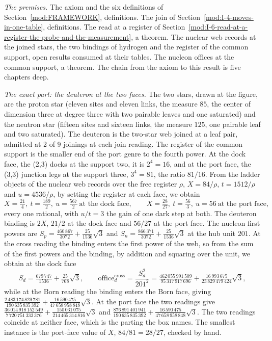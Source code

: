 \begin{chproof}
\textit{The premises.} The axiom and the six definitions of Section~\ref{mod:FRAMEWORK}, definitions. The join of Section~\ref{mod:I-4-moves-in-one-table}, definitions. The read at a register of Section~\ref{mod:I-6-read-at-a-register-the-probe-and-the-measurement}, a theorem. The nuclear web records at the joined stars, the two bindings of hydrogen and the register of the common support, open results consumed at their tables. The nucleon offices at the common support, a theorem. The chain from the axiom to this result is five chapters deep.

\textit{The exact part: the deuteron at the two faces.} The two stars, drawn at the figure, are the proton star (eleven sites and eleven links, the measure $85$, the center of dimension three at degree three with two pairable leaves and one saturated) and the neutron star (fifteen sites and sixteen links, the measure $125$, one pairable leaf and two saturated). The deuteron is the two-star web joined at a leaf pair, admitted at 2 of 9 joinings at each join reading. The register of the common support is the smaller end of the port genre to the fourth power. At the dock face, the (2,3) docks at the support two, it is $2^{4}=16$, and at the port face, the (3,3) junction legs at the support three, $3^{4}=81$, the ratio $81/16$. From the ladder objects of the nuclear web records over the free register $\rho$, $X=84/\rho$, $t=1512/\rho$ and $u=4536/\rho$, by setting the register at each face, we obtain
\begin{equation}
X=\tfrac{21}{4},\ t=\tfrac{189}{2},\ u=\tfrac{567}{2}\ \text{at the dock face},\qquad X=\tfrac{28}{27},\ t=\tfrac{56}{3},\ u=56\ \text{at the port face},
\end{equation}
every one rational, with $u/t=3$ the gain of one dark step at both. The deuteron binding is $2X$, $21/2$ at the dock face and $56/27$ at the port face. The nucleon first powers are $S_p=\tfrac{460\,867}{3072}+\tfrac{25}{1536}\sqrt{3}$ and $S_n=\tfrac{866\,371}{3072}+\tfrac{25}{1536}\sqrt{3}$ at the hub unit $201$. At the cross reading the binding enters the first power of the web, so from the sum of the first powers and the binding, by addition and squaring over the unit, we obtain at the dock face
\begin{equation}
S_d=\tfrac{679\,747}{1536}+\tfrac{25}{768}\sqrt{3},\qquad \mathrm{office}_{d}^{\mathrm{cross}}=\frac{S_d^{2}}{201^{2}}=\tfrac{462\,055\,991\,509}{95\,317\,917\,696}+\tfrac{16\,993\,675}{23\,829\,479\,424}\sqrt{3},
\end{equation}
while at the Born reading the binding enters the Born face, giving $\tfrac{2\,483\,174\,829\,781}{190\,635\,835\,392}+\tfrac{16\,590\,475}{47\,658\,958\,848}\sqrt{3}$. At the port face the two readings give $\tfrac{36\,014\,918\,152\,549}{7\,720\,751\,333\,376}+\tfrac{150\,031\,075}{214\,465\,314\,816}\sqrt{3}$ and $\tfrac{876\,891\,401\,941}{190\,635\,835\,392}+\tfrac{16\,590\,475}{47\,658\,958\,848}\sqrt{3}$. The two readings coincide at neither face, which is the parting the box names. The smallest instance is the port-face value of $X$, $84/81=28/27$, checked by hand.


\end{chproof}
